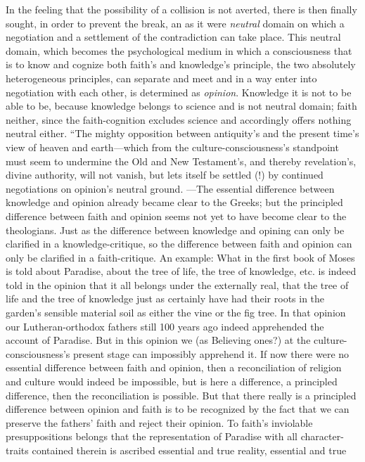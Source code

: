 \documentclass[12pt,a4paper]{book}
\begin{document}
In the feeling that the possibility of a collision is not averted, there is then finally sought, in order to prevent
the break, an as it were \emph{neutral} domain on which a negotiation and a settlement of the contradiction can take
place. This neutral domain, which becomes the psychological medium in which a consciousness that is to know and
cognize both faith's and knowledge's principle, the two absolutely heterogeneous principles, can separate and meet and
in a way enter into negotiation with each other, is determined as \emph{opinion}. Knowledge it is not to be able to
be, because knowledge belongs to science and is not neutral domain; faith neither, since the faith-cognition excludes
science and accordingly offers nothing neutral either. ``The mighty opposition between antiquity's and the present
time's view of heaven and earth---which from the culture-consciousness's standpoint must seem to undermine the Old
and New Testament's, and thereby revelation's, divine authority, will not vanish, but lets itself be settled (!) by
continued negotiations on opinion's neutral ground. ---The essential difference between knowledge and opinion already
became clear to the Greeks; but the principled difference between faith and opinion seems not yet to have become clear
to the theologians. Just as the difference between knowledge and opining can only be clarified in a knowledge-critique,
so the difference between faith and opinion can only be clarified in a faith-critique. An example: What in the first
book of Moses is told about Paradise, about the tree of life, the tree of knowledge, etc. is indeed told in the opinion
that it all belongs under the externally real, that the tree of life and the tree of knowledge just as certainly have
had their roots in the garden's sensible material soil as either the vine or the fig tree. In that opinion our
Lutheran-orthodox fathers still 100 years ago indeed apprehended the account of Paradise. But in this opinion we (as
Believing ones?) at the culture-consciousness's present stage can impossibly apprehend it. If now there were no
essential difference between faith and opinion, then a reconciliation of religion and culture would indeed be
impossible, but is here a difference, a principled difference, then the reconciliation is possible. But that there
really is a principled difference between opinion and faith is to be recognized by the fact that we can preserve the
fathers' faith and reject their opinion. To faith's inviolable presuppositions belongs that the representation of
Paradise with all character-traits contained therein is ascribed essential and true reality, essential and true
\end{document}
